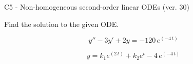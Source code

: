 \begin{exercise}
  \begin{exerciseTitle}C5 - Non-homogeneous second-order linear ODEs (ver. 30)\end{exerciseTitle}
  \begin{exerciseStatement}
    
Find the solution to the given ODE.

    
\[y''-3y'+2y = -120 \, e^{\left(-4 \, t\right)}\]

  \end{exerciseStatement}
  \begin{exerciseAnswer}
    
\[y= k_{1} e^{\left(2 \, t\right)} + k_{2} e^{t} - 4 \, e^{\left(-4 \, t\right)}\]

  \end{exerciseAnswer}
\end{exercise}